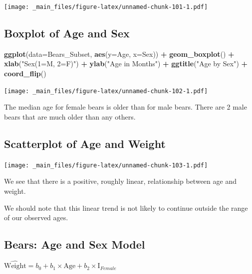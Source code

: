\documentclass[]{book}
\newenvironment{Shaded}{\begin{snugshade}}{\end{snugshade}}
\newcommand{\KeywordTok}[1]{\textcolor[rgb]{0.13,0.29,0.53}{\textbf{#1}}}
\newcommand{\DataTypeTok}[1]{\textcolor[rgb]{0.13,0.29,0.53}{#1}}
\newcommand{\StringTok}[1]{\textcolor[rgb]{0.31,0.60,0.02}{#1}}
\newcommand{\OperatorTok}[1]{\textcolor[rgb]{0.81,0.36,0.00}{\textbf{#1}}}
\newcommand{\NormalTok}[1]{#1}
\begin{document}
\texttt{[image: \_main\_files/figure-latex/unnamed-chunk-101-1.pdf]}

\subsection{Boxplot of Age and Sex}\label{boxplot-of-age-and-sex}

\begin{Shaded}
\begin{Highlighting}[]
\KeywordTok{ggplot}\NormalTok{(}\DataTypeTok{data=}\NormalTok{Bears_Subset, }\KeywordTok{aes}\NormalTok{(}\DataTypeTok{y=}\NormalTok{Age, }\DataTypeTok{x=}\NormalTok{Sex)) }\OperatorTok{+}\StringTok{ }
\StringTok{  }\KeywordTok{geom_boxplot}\NormalTok{() }\OperatorTok{+}\StringTok{ }
\StringTok{  }\KeywordTok{xlab}\NormalTok{(}\StringTok{"Sex(1=M, 2=F)"}\NormalTok{) }\OperatorTok{+}\StringTok{ }\KeywordTok{ylab}\NormalTok{(}\StringTok{"Age in Months"}\NormalTok{) }\OperatorTok{+}\StringTok{ }\KeywordTok{ggtitle}\NormalTok{(}\StringTok{"Age by Sex"}\NormalTok{) }\OperatorTok{+}\StringTok{ }\KeywordTok{coord_flip}\NormalTok{()}
\end{Highlighting}
\end{Shaded}

\texttt{[image: \_main\_files/figure-latex/unnamed-chunk-102-1.pdf]}

The median age for female bears is older than for male bears. There are
2 male bears that are much older than any others.

\subsection{Scatterplot of Age and
Weight}\label{scatterplot-of-age-and-weight}

\texttt{[image: \_main\_files/figure-latex/unnamed-chunk-103-1.pdf]}

We see that there is a positive, roughly linear, relationship between
age and weight.

We should note that this linear trend is not likely to continue outside
the range of our observed ages.

\subsection{Bears: Age and Sex Model}\label{bears-age-and-sex-model}

\(\widehat{\text{Weight}}= b_0+ b_1 \times\text{Age}+ b_2\times\text{I}_{Female}\)
\end{document}
